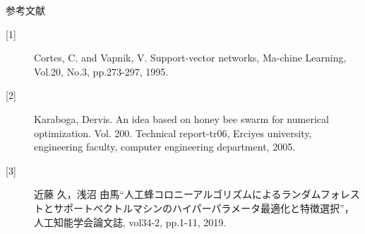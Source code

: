 \documentclass[12pt, cjk, dvipdfmx]{beamer}
\begin{document}
\begin{frame}
\begin{columns}[t]
\begin{column}{0.490\linewidth}
\begin{mybox}{参考文献}
\begin{description}
                \item[{[1]}] Cortes, C. and Vapnik, V. Support-vector networks, Ma-chine Learning, Vol.20, No.3, pp.273-297, 1995.
                \item[{[2]}] Karaboga, Dervis. An idea based on honey bee swarm for numerical optimization. Vol. 200. Technical report-tr06, Erciyes university, engineering faculty, computer engineering department, 2005.
                \item[{[3]}] 近藤 久，浅沼 由馬“人工蜂コロニーアルゴリズムによるランダムフォレストとサポートベクトルマシンのハイパーパラメータ最適化と特徴選択”，人工知能学会論文誌, vol34-2, pp.1-11, 2019.
              \end{description}
            \end{mybox}
        \end{column}
      \end{columns}
  \end{frame}
\end{document}
